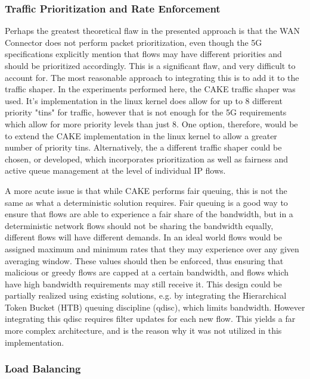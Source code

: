 \subsubsection{Traffic Prioritization and Rate Enforcement}

Perhaps the greatest theoretical flaw in the presented approach is that the WAN Connector does not perform packet prioritization, even though the 5G specifications explicitly mention that flows may have different priorities and should be prioritized accordingly. This is a significant flaw, and very difficult to account for. The most reasonable approach to integrating this is to add it to the traffic shaper. In the experiments performed here, the CAKE traffic shaper was used. It's implementation in the linux kernel does allow for up to 8 different priority 
"tins" for traffic, however that is not enough for the 5G requirements which allow for more priority levels than just 8. One option, therefore, would be to extend the CAKE implementation in the linux kernel to allow a greater number of priority tins. Alternatively, the a different traffic shaper could be chosen, or developed, which incorporates prioritization as well as fairness and active queue management at the level of individual IP flows.

A more acute issue is that while CAKE performs fair queuing, this is not the same as what a deterministic solution requires. Fair queuing is a good way to ensure that flows are able to experience a fair share of the bandwidth, but in a deterministic network flows should not be sharing the bandwidth equally, different flows will have different demands. In an ideal world flows would be assigned maximum and minimum rates  that they may experience over any given averaging window. These values should then be enforced, thus ensuring that malicious or greedy flows are capped at a certain bandwidth, and flows which have high bandwidth requirements may still receive it. This design could be partially realized using existing solutions,  e.g. by integrating the Hierarchical Token Bucket (HTB) queuing discipline (qdisc), which limits bandwidth. However integrating this qdisc requires filter updates for each new flow. This yields a far more complex architecture, and is the reason why it was not utilized in this implementation.

\subsubsection{Load Balancing}

